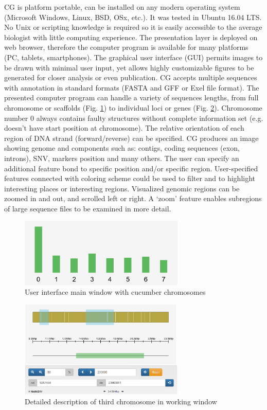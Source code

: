 \documentclass[a4paper]{spie}
\newcommand{\appShortcut}{CG}
\begin{document}
\appShortcut{} is platform portable, can be installed on any modern operating system (Microsoft Windows, Linux, BSD, OSx, etc.).
It was tested in Ubuntu 16.04 LTS.
No Unix or scripting knowledge is required so it is easily accessible to the average biologist with little computing experience.
The presentation layer is deployed on web browser, therefore the computer program is available for many platforms (PC, tablets, smartphones).
The graphical user interface (GUI) permits images to be drawn with minimal user input,
yet allows highly customizable figures to be generated for closer analysis or even publication.
\appShortcut{} accepts multiple sequences with annotation in standard formats (FASTA and GFF or Exel file format).
The presented computer program can handle a variety of sequences lengths, from full chromosome or scaffolds  (Fig. \ref{fig:organism})
to individual loci or genes (Fig. \ref{fig:chromosome}). Chromosome number 0 always contains faulty structures without complete information set (e.g. doesn't have start position at chromosome).
The relative orientation of each region of DNA strand (forward/reverse) can be specified. 
\appShortcut{} produces an image showing genome and components such as: contigs, coding sequences (exon, introns), SNV, markers position and many others.
The user can specify an additional feature bond to specific position and/or specific region.
User-specified features connected with coloring scheme could be used to filter and to highlight interesting places or interesting regions.
Visualized genomic regions can be zoomed in and out, and scrolled left or right.
A ‘zoom’ feature enables subregions of large sequence files to be examined in more detail.

\begin{figure}[htp]
  \centering
  \includegraphics[width=0.7\textwidth]{img/chromosomy.png}
  \caption{User interface main window with cucumber chromosomes}
  \label{fig:organism}
\end{figure}


\begin{figure}[htp]
  \centering
  \includegraphics[width=0.7\textwidth]{img/skafoldy2.png}
  \caption{Detailed description of third chromosome in working window}
  \label{fig:chromosome}
\end{figure}
\end{document}
